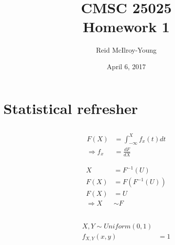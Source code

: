 \documentclass[12pt,a4paper]{article}
\author{Reid McIlroy-Young}
\title{CMSC 25025 \\ Homework 1}
\date{April 6, 2017}
\begin{document}
\maketitle

\section{Statistical refresher}
\subsection{}

\begin{align*}
F(X) &= \int_{-\infty}^{X} f_x(t) dt\\
\Rightarrow f_x&= \frac{dF}{dX}
\end{align*}

\begin{align*}
X &= F^{-1}(U)\\
F(X) &= F(F^{-1}(U))\\
F(X) &= U\\
\Rightarrow X &\sim F
\end{align*}

\subsection{}

\begin{align}
X, Y \sim Uniform(0,1)\\
f_{X,Y}(x,y) &= 1
\end{align}
\end{document}
